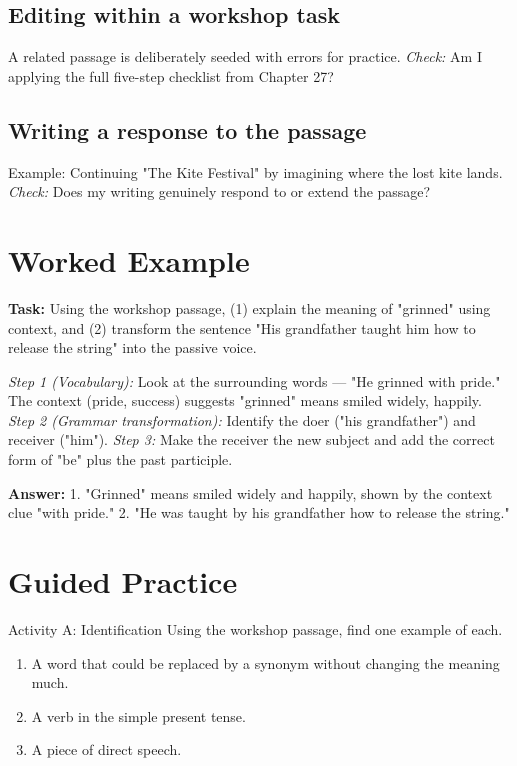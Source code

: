 \subsection*{Editing within a workshop task}
A related passage is deliberately seeded with errors for practice. \textit{Check:} Am I applying the full five-step checklist from Chapter 27?

\subsection*{Writing a response to the passage}
Example: Continuing "The Kite Festival" by imagining where the lost kite lands. \textit{Check:} Does my writing genuinely respond to or extend the passage?

\section{Worked Example}
\begin{examplebox}
\textbf{Task:} Using the workshop passage, (1) explain the meaning of "grinned" using context, and (2) transform the sentence "His grandfather taught him how to release the string" into the passive voice.

\textit{Step 1 (Vocabulary):} Look at the surrounding words — "He grinned with pride." The context (pride, success) suggests "grinned" means smiled widely, happily.
\textit{Step 2 (Grammar transformation):} Identify the doer ("his grandfather") and receiver ("him").
\textit{Step 3:} Make the receiver the new subject and add the correct form of "be" plus the past participle.

\textbf{Answer:}
1. "Grinned" means smiled widely and happily, shown by the context clue "with pride."
2. "He was taught by his grandfather how to release the string."
\end{examplebox}

\section{Guided Practice}
\begin{activitybox}{Activity A: Identification}
Using the workshop passage, find one example of each.
\begin{enumerate}
    \item A word that could be replaced by a synonym without changing the meaning much.
    \item A verb in the simple present tense.
    \item A piece of direct speech.
\end{enumerate}
\end{activitybox}

